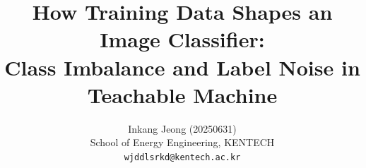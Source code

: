 \documentclass[10pt,twocolumn,letterpaper]{article}
\title{How Training Data Shapes an Image Classifier:\\Class Imbalance and Label Noise in Teachable Machine}
\author{Inkang Jeong (20250631)\\
School of Energy Engineering, KENTECH\\
{\tt\small wjddlsrkd@kentech.ac.kr}
}
\begin{document}
\maketitle





{
    \small
    
    
}
\end{document}
